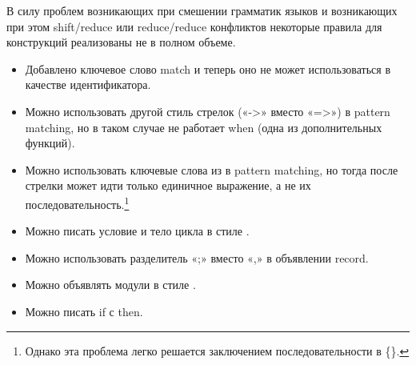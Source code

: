 В силу проблем возникающих при смешении грамматик языков и возникающих при этом shift/reduce или reduce/reduce конфликтов некоторые правила для конструкций реализованы не в полном объеме.

\begin{itemize}

\item Добавлено ключевое слово match и теперь оно не может использоваться в качестве идентификатора.

\item Можно использовать другой стиль стрелок («->» вместо «=>») в pattern matching, но в таком случае не работает when (одна из дополнительных функций).

\item Можно использовать ключевые слова из \OCaml{} в pattern matching, но тогда после стрелки может идти только единичное выражение, а не их последовательность.\footnote[1]{Однако эта проблема легко решается заключением последовательности в \{\}. }

\item Можно писать условие и тело цикла в стиле \OCaml{}.

\item Можно использовать разделитель «;» вместо «,» в объявлении record.

\item Можно объявлять модули в стиле \OCaml{}.

\item Можно писать if с then.

\end{itemize}
